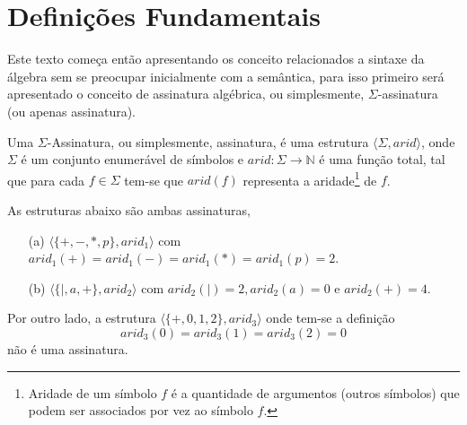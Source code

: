 

\section{Definições Fundamentais}


Este texto começa então apresentando os conceito relacionados a sintaxe da álgebra sem se preocupar inicialmente com a semântica, para isso primeiro será apresentado o conceito de assinatura algébrica, ou simplesmente, $\Sigma$-assinatura (ou apenas assinatura).

\begin{definicao}[Assinatura]\label{def:SigmaAssinatura}
  Uma $\Sigma$-Assinatura, ou simplesmente, assinatura, é uma estrutura $\langle \Sigma, arid \rangle$, onde $\Sigma$ é um conjunto enumerável de símbolos e $arid : \Sigma \rightarrow \mathbb{N}$ é uma função total, tal que para cada $f \in \Sigma$ tem-se que $arid(f)$ representa a aridade\footnote{Aridade de um símbolo $f$ é a quantidade de argumentos (outros símbolos) que podem ser associados por vez ao símbolo $f$.} de $f$.
\end{definicao}

\begin{exemplo}\label{exe:SigmaAssinatura1}
  As estruturas abaixo são ambas assinaturas,
  \begin{itemize}
    \item[(a)] $\langle \{+, -, *, p \}, arid_1 \rangle$ com $arid_1(+) = arid_1(-) = arid_1(*) = arid_1(p) = 2$.
    \item[(b)] $\langle \{|, a, +\}, arid_2 \rangle$ com $arid_2(|) = 2,  arid_2(a) = 0$ e $arid_2(+) = 4$.
  \end{itemize}
  Por outro lado, a estrutura $\langle \{+, 0, 1, 2\}, arid_3 \rangle$ onde tem-se a definição 
  $$arid_3(0) = arid_3(1) = arid_3(2) = 0$$ 
  não é uma assinatura.
\end{exemplo}

